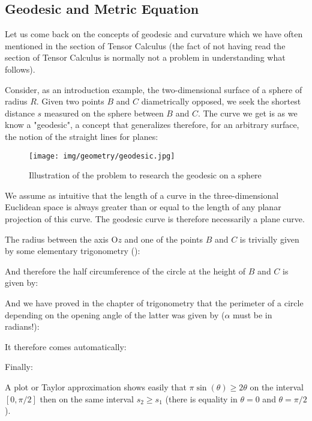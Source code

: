 	\subsection{Geodesic and Metric Equation}\label{geodesic and metric equation}
	Let us come back on the concepts of geodesic and curvature which we have often mentioned in the section of Tensor Calculus (the fact of not having read the section of Tensor Calculus is normally not a problem in understanding what follows).
	
	Consider, as an introduction example, the two-dimensional surface of a sphere of radius $R$. Given two points $B$ and $C$ diametrically opposed, we seek the shortest distance $s$ measured on the sphere between $B$ and $C$. The curve we get is as we know a "geodesic", a concept that generalizes therefore, for an arbitrary surface, the notion of the straight lines for planes:
	
	\begin{figure}[H]
		\centering
		\texttt{[image: img/geometry/geodesic.jpg]}
		\caption{Illustration of the problem to research the geodesic on a sphere}
	\end{figure}
	
	\begin{tcolorbox}[title=Remark,colframe=black,arc=10pt]
	We assume as intuitive that the length of a curve in the three-dimensional Euclidean space is always greater than or equal to the length of any planar projection of this curve. The geodesic curve is therefore necessarily a plane curve.
	\end{tcolorbox}
	
	The radius between the axis $\text{O}z$ and one of the points $B$ and $C$ is trivially given by some elementary trigonometry ():
	
	And therefore the half circumference of the circle at the height of $B$ and $C$ is given by:
	
	And we have proved in the chapter of trigonometry that the perimeter of a circle depending on the opening angle of the latter was given by ($\alpha$ must be in radians!):
	
	It therefore comes automatically:
	
	Finally:
	
	A plot or Taylor approximation shows easily that $\pi\sin(\theta)\geq 2\theta$ on the interval $[0,\pi/2]$ then on the same interval $s_2 \geq s_1$ (there is equality in $\theta=0$ and $\theta=\pi/2$).
	
